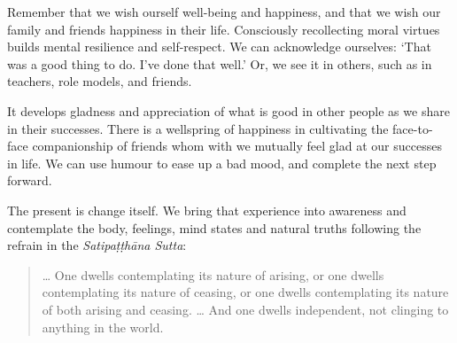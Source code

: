 Remember that we wish ourself well-being and happiness, and that we wish
our family and friends happiness in their life. Consciously recollecting
moral virtues builds mental resilience and self-respect. We can
acknowledge ourselves: `That was a good thing to do. I've done that
well.' Or, we see it in others, such as in teachers, role models, and
friends.

It develops gladness and appreciation of what is good in other people as
we share in their successes. There is a wellspring of happiness in
cultivating the face-to-face companionship of friends whom with we
mutually feel glad at our successes in life. We can use humour to ease
up a bad mood, and complete the next step forward.

The present is change itself. We bring that experience into awareness
and contemplate the body, feelings, mind states and natural truths
following the refrain in the \emph{Satipaṭṭhāna Sutta}:

\begin{quote}
\ldots{} One dwells contemplating its nature of arising, or one dwells
contemplating its nature of ceasing, or one dwells contemplating its
nature of both arising and ceasing. \ldots{} And one dwells independent,
not clinging to anything in the world.

\bigskip

\end{quote}
